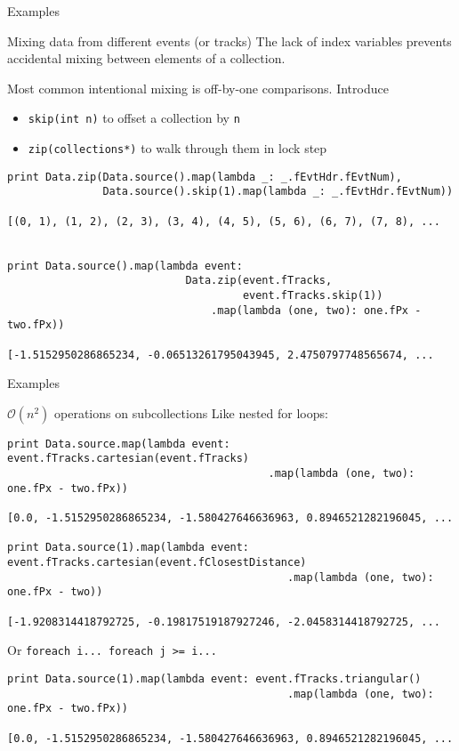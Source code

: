 \documentclass{beamer}
\begin{document}
\begin{frame}[fragile]{Examples}
\begin{block}{Mixing data from different events (or tracks)}
The lack of index variables prevents accidental mixing between elements of a collection.

\vfill
Most common intentional mixing is off-by-one comparisons. Introduce
\begin{itemize}
\item {\tt skip(int n)} to offset a collection by {\tt n}
\item {\tt zip(collections*)} to walk through them in lock step
\end{itemize}

\vfill
{\scriptsize \begin{verbatim}
print Data.zip(Data.source().map(lambda _: _.fEvtHdr.fEvtNum),
               Data.source().skip(1).map(lambda _: _.fEvtHdr.fEvtNum))

[(0, 1), (1, 2), (2, 3), (3, 4), (4, 5), (5, 6), (6, 7), (7, 8), ...


print Data.source().map(lambda event:
                            Data.zip(event.fTracks,
                                     event.fTracks.skip(1))
                                .map(lambda (one, two): one.fPx - two.fPx))

[-1.5152950286865234, -0.06513261795043945, 2.4750797748565674, ...
\end{verbatim}}
\end{block}
\end{frame}

\begin{frame}[fragile]{Examples}
\begin{block}{${\mathcal O}(n^2)$ operations on subcollections}
Like nested for loops:

{\scriptsize \begin{verbatim}
print Data.source.map(lambda event: event.fTracks.cartesian(event.fTracks)
                                         .map(lambda (one, two): one.fPx - two.fPx))

[0.0, -1.5152950286865234, -1.580427646636963, 0.8946521282196045, ...

print Data.source(1).map(lambda event: event.fTracks.cartesian(event.fClosestDistance)
                                            .map(lambda (one, two): one.fPx - two))

[-1.9208314418792725, -0.19817519187927246, -2.0458314418792725, ...
\end{verbatim}}

\vfill
Or {\tt foreach i... foreach j >= i...}
{\scriptsize \begin{verbatim}
print Data.source(1).map(lambda event: event.fTracks.triangular()
                                            .map(lambda (one, two): one.fPx - two.fPx))

[0.0, -1.5152950286865234, -1.580427646636963, 0.8946521282196045, ...
\end{verbatim}}
\end{block}
\end{frame}
\end{document}
